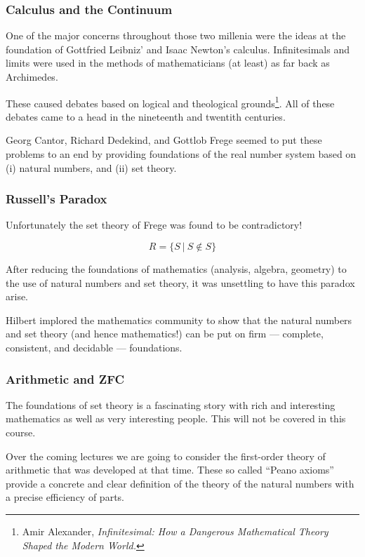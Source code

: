\documentclass{beamer}
\theoremstyle{indentDefn} \newtheorem{defn}[]{Definition}
\begin{document}
\begin{frame}
	\frametitle{Calculus and the Continuum}
	
	One of the major concerns throughout those two millenia were the ideas at the foundation of Gottfried Leibniz' and Isaac Newton's calculus. Infinitesimals and limits were used in the methods of mathematicians (at least) as far back as Archimedes. 
	
	\vspace{0.5cm}
	
	These caused debates based on logical and theological grounds\footnote{Amir Alexander, \emph{Infinitesimal: How a Dangerous Mathematical Theory Shaped the Modern World.}}. All of these debates came to a head in the nineteenth and twentith centuries. 
	
	\vspace{0.5cm} 
	
	Georg Cantor, Richard Dedekind, and Gottlob Frege seemed to put these problems to an end by providing foundations of the real number system based on (i) natural numbers, and (ii) set theory. 
	
\end{frame}

\begin{frame}
	\frametitle{Russell's Paradox}
	
	Unfortunately the set theory of Frege was found to be contradictory!
	
	$$R = \{S \ | \ S \notin S \}$$
	
	After reducing the foundations of mathematics (analysis, algebra, geometry) to the use of natural numbers and set theory, it was unsettling to have this paradox arise. 

	\vspace{0.2cm}

	Hilbert implored the mathematics community to show that the natural numbers and set theory (and hence mathematics!) can be put on firm --- complete, consistent, and decidable --- foundations. 

\end{frame}

\begin{frame}
	\frametitle{Arithmetic and ZFC}

	The foundations of set theory is a fascinating story with rich and interesting mathematics as well as very interesting people. This will not be covered in this course. 

	\vspace{0.2cm}
	
	Over the coming lectures we are going to consider the first-order theory of arithmetic that was developed at that time. These so called ``Peano axioms'' provide a concrete and clear definition of the theory of the natural numbers with a precise efficiency of parts. 
	
\end{frame}
\end{document}
